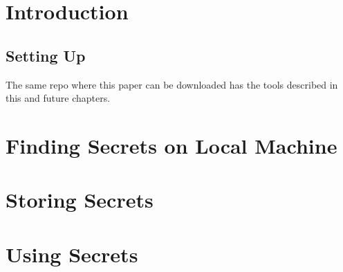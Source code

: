 \documentclass[11pt]{report}
\begin{document}
	\cleardoublepage
	
	
	\tableofcontents
	\thispagestyle{empty}
	\cleardoublepage
	\setcounter{page}{1}
	
	
	\chapter{Introduction}
	\lipsum[1]
	
	\section{Setting Up}
	
	The same repo where this paper can be downloaded has the tools described in this and future chapters.
	
	\chapter{Finding Secrets on Local Machine}
	
	\lipsum[1]
	
	\chapter{Storing Secrets}
	
	\lipsum[1]
	
	\chapter{Using Secrets}
	
	\lipsum[1]
	
\end{document}

